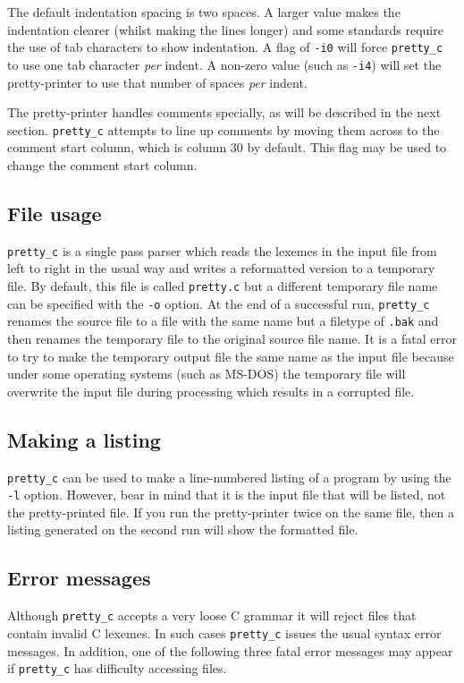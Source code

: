  The default indentation spacing is two spaces. 
A larger value makes the indentation clearer (whilst making the lines longer) and some standards
require the use of tab characters to show indentation. A flag of {\tt -i0} will force
\verb+pretty_c+ to use one tab character {\em per} indent. A non-zero value (such as {\tt -i4})
will set the pretty-printer to use that number of spaces {\em per} indent.

 The pretty-printer handles
comments specially, as will be described in the next section.
\verb+pretty_c+ attempts to line up comments by moving them across to
the comment start  column, which is column 30 by default. This flag may
be used to change the comment start column.

\subsection{File usage}
\verb+pretty_c+ is a single pass parser which reads the lexemes in the input file
from left to right in the usual way and writes a reformatted version to a temporary
file. By default, this file is called \verb+pretty.c+ but a different temporary file name
can be specified with the \verb+-o+ option. At the end of a successful
run, \verb+pretty_c+ renames the source file to a file with the same name but a filetype
of {\tt .bak} and then renames the temporary file to the original source file name.
It is a fatal error to try to make the temporary output file the same name as the input file
because under some operating systems (such as MS-DOS) the temporary file will overwrite the
input file during processing which results in a corrupted file.

\subsection{Making a listing}
\verb+pretty_c+ can be used to make a line-numbered listing of a program by using the
\verb+-l+ option. However, bear in mind that it is the input file that will be listed, not
the pretty-printed file. If you run the pretty-printer twice on the same file, then a listing generated
on the second run will show the formatted file.

\subsection{Error messages}
Although \verb+pretty_c+ accepts a very loose C grammar it will reject files
that contain invalid C lexemes. In such cases \verb+pretty_c+ issues the usual syntax
error messages. In addition, one of the following three fatal error messages may appear
if \verb+pretty_c+ has difficulty accessing files.

